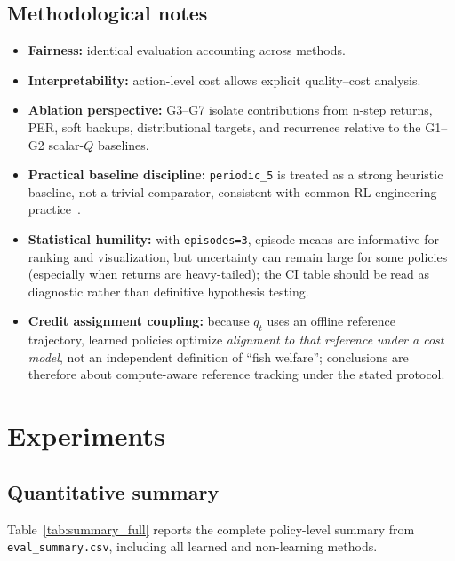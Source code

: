 \documentclass[letterpaper]{article}
\begin{document}
\subsection{Methodological notes}
\begin{itemize}[leftmargin=1.2em]
    \item \textbf{Fairness:} identical evaluation accounting across methods.
    \item \textbf{Interpretability:} action-level cost allows explicit quality--cost analysis.
    \item \textbf{Ablation perspective:} G3--G7 isolate contributions from n-step returns, PER, soft backups, distributional targets, and recurrence relative to the G1--G2 scalar-$Q$ baselines.
    \item \textbf{Practical baseline discipline:} \texttt{periodic\_5} is treated as a strong heuristic baseline, not a trivial comparator, consistent with common RL engineering practice~\cite{sb3,cleanrldocs}.
    \item \textbf{Statistical humility:} with \texttt{episodes=3}, episode means are informative for ranking and visualization, but uncertainty can remain large for some policies (especially when returns are heavy-tailed); the CI table should be read as diagnostic rather than definitive hypothesis testing.
    \item \textbf{Credit assignment coupling:} because $q_t$ uses an offline reference trajectory, learned policies optimize \emph{alignment to that reference under a cost model}, not an independent definition of ``fish welfare''; conclusions are therefore about compute-aware reference tracking under the stated protocol.
\end{itemize}

\section{Experiments}
\label{sec:exp_results}
\subsection{Quantitative summary}
Table~\ref{tab:summary_full} reports the complete policy-level summary from \texttt{eval\_summary.csv}, including all learned and non-learning methods.
\end{document}
